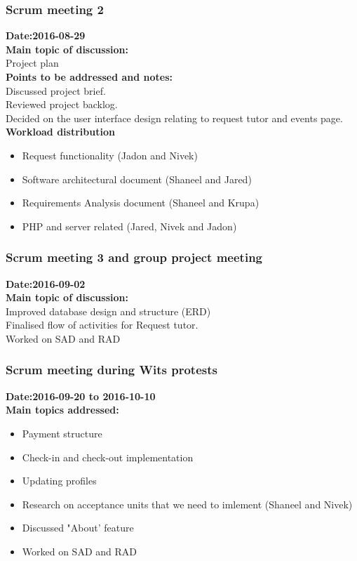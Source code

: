 \documentclass[12pt]{article}
\begin{document}
{\subsubsection{Scrum meeting 2}
\textbf{Date:2016-08-29}\\
\textbf{Main topic of discussion:}\\
Project plan\\
\textbf{Points to be addressed and notes:}\\
Discussed project brief. \\
Reviewed project backlog.\\
Decided on the user interface design relating to request tutor and events page.\\ 
\textbf{Workload distribution}
\begin{itemize}
\item Request functionality  (Jadon and Nivek)
\item Software architectural document (Shaneel and Jared)
\item Requirements Analysis document (Shaneel and Krupa)
\item PHP and server related (Jared, Nivek and Jadon)
\end{itemize}
\subsubsection{Scrum meeting 3 and group project meeting}
\textbf{Date:2016-09-02}\\
\textbf{Main topic of discussion:}\\
Improved database design and structure (ERD)\\
Finalised flow of activities for Request tutor.\\
Worked on SAD and RAD

\subsubsection{Scrum meeting during Wits protests}
\textbf{Date:2016-09-20 to 2016-10-10}\\
\textbf{Main topics addressed:}
\begin{itemize}
\item Payment structure
\item Check-in and check-out implementation
\item Updating profiles
\item  Research on acceptance units that we need to imlement (Shaneel and Nivek)
\item Discussed "About' feature
\item Worked on SAD and RAD
\end{itemize}

}
\end{document}
